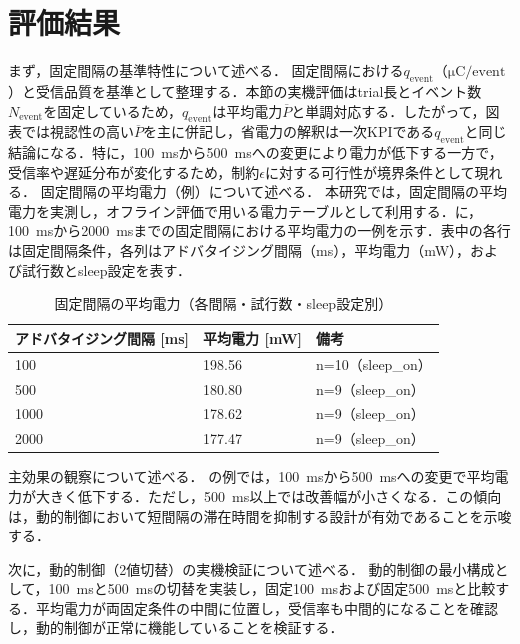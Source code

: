 \section{評価結果}
\label{sec:evaluation_results}

まず，固定間隔の基準特性について述べる．
固定間隔における$q_{\mathrm{event}}$（$\si{\micro\coulomb}/\text{event}$）と受信品質を基準として整理する．本節の実機評価はtrial長とイベント数$N_{\mathrm{event}}$を固定しているため，$q_{\mathrm{event}}$は平均電力$\overline{P}$と単調対応する．したがって，図表では視認性の高い$\overline{P}$を主に併記し，省電力の解釈は一次KPIである$q_{\mathrm{event}}$と同じ結論になる．特に，\SI{100}{\milli\second}から\SI{500}{\milli\second}への変更により電力が低下する一方で，受信率や遅延分布が変化するため，制約$\epsilon$に対する可行性が境界条件として現れる．
\noindent 固定間隔の平均電力（例）について述べる．
本研究では，固定間隔の平均電力を実測し，オフライン評価で用いる電力テーブルとして利用する．に，\SI{100}{\milli\second}から\SI{2000}{\milli\second}までの固定間隔における平均電力の一例を示す．表中の各行は固定間隔条件，各列はアドバタイジング間隔（ms），平均電力（mW），および試行数とsleep設定を表す．

\begin{table}[tb]
  \centering
  \caption{固定間隔の平均電力（各間隔・試行数・sleep設定別）}
  \label{tab:power_table_example}
  \begin{tabular}{lll}
    \toprule
    アドバタイジング間隔 [ms] & 平均電力 [mW] & 備考 \\
    \midrule
    100  & 198.56 & n=10（sleep\_on） \\
    500  & 180.80 & n=9（sleep\_on） \\
    1000 & 178.62 & n=9（sleep\_on） \\
    2000 & 177.47 & n=9（sleep\_on） \\
    \bottomrule
  \end{tabular}
\end{table}
\noindent 主効果の観察について述べる．
の例では，\SI{100}{\milli\second}から\SI{500}{\milli\second}への変更で平均電力が大きく低下する．ただし，\SI{500}{\milli\second}以上では改善幅が小さくなる．この傾向は，動的制御において短間隔の滞在時間を抑制する設計が有効であることを示唆する．

次に，動的制御（2値切替）の実機検証について述べる．
動的制御の最小構成として，\SI{100}{\milli\second}と\SI{500}{\milli\second}の切替を実装し，固定\SI{100}{\milli\second}および固定\SI{500}{\milli\second}と比較する．平均電力が両固定条件の中間に位置し，受信率も中間的になることを確認し，動的制御が正常に機能していることを検証する．

